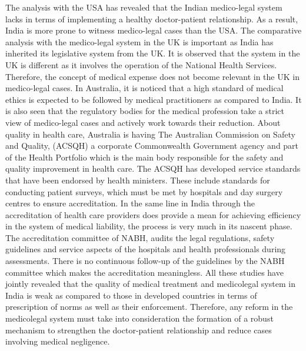 \begin{multicols}{2}
\noi
The analysis with the USA has revealed that the Indian medico-legal system lacks in terms of implementing a healthy doctor-patient relationship. As a result, India is more prone to witness medico-legal cases than the USA. The comparative analysis with the medico-legal system in the UK is important as India has inherited its legislative system from the UK. It is observed that the system in the UK is different as it involves the operation of the National Health Services. Therefore, the concept of medical expense does not become relevant in the UK in medico-legal cases. In Australia, it is noticed that a high standard of medical ethics is expected to be followed by medical practitioners as compared to India. It is also seen that the regulatory bodies for the medical profession take a strict view of medico-legal cases and actively work towards their reduction. About quality in health care, Australia is having The Australian Commission on Safety and Quality, (ACSQH) a corporate Commonwealth Government agency and part of the Health Portfolio which is the main body responsible for the safety and quality improvement in health care. The ACSQH has developed service standards that have been endorsed by health ministers. These include standards for conducting patient surveys, which must be met by hospitals and day surgery centres to ensure accreditation. In the same line in India through the accreditation of health care providers does provide a mean for achieving efficiency in the system of medical liability, the process is very much in its nascent phase. The accreditation committee of NABH, audits the legal regulations, safety guidelines and service aspects of the hospitals and health professionals during assessments. There is no continuous follow-up of the guidelines by the NABH committee which makes the accreditation meaningless. All these studies have jointly revealed that the quality of medical treatment and medicolegal system in India is weak as compared to those in developed countries in terms of prescription of norms as well as their enforcement. Therefore, any reform in the medicolegal system must take into consideration the formation of a robust mechanism to strengthen the doctor-patient relationship and reduce cases involving medical negligence.

\end{multicols}

\label{end2016-art6}
